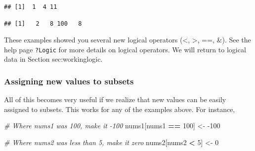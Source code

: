 \documentclass[]{book}
\newenvironment{Shaded}{\begin{snugshade}}{\end{snugshade}}
\newcommand{\CommentTok}[1]{\textcolor[rgb]{0.56,0.35,0.01}{\textit{#1}}}
\newcommand{\DecValTok}[1]{\textcolor[rgb]{0.00,0.00,0.81}{#1}}
\newcommand{\KeywordTok}[1]{\textcolor[rgb]{0.13,0.29,0.53}{\textbf{#1}}}
\newcommand{\NormalTok}[1]{#1}
\newcommand{\OperatorTok}[1]{\textcolor[rgb]{0.81,0.36,0.00}{\textbf{#1}}}
\newcommand{\StringTok}[1]{\textcolor[rgb]{0.31,0.60,0.02}{#1}}
\begin{document}
\begin{Shaded}
\end{Shaded}

\begin{verbatim}
## [1]  1  4 11
\end{verbatim}

\begin{Shaded}
\end{Shaded}

\begin{verbatim}
## [1]   2   8 100   8
\end{verbatim}

These examples showed you several new logical operators (\textless{}, \textgreater{}, ==, \&). See the help page \texttt{?Logic} for more details on logical operators. We will return to logical data in Section sec:workinglogic.

\hypertarget{assigning-new-values-to-subsets}{%
\subsubsection{Assigning new values to subsets}\label{assigning-new-values-to-subsets}}

All of this becomes very useful if we realize that new values can be easily assigned to subsets. This works for any of the examples above. For instance,

\begin{Shaded}
\begin{Highlighting}[]
\CommentTok{# Where nums1 was 100, make it -100}
\NormalTok{nums1[nums1 }\OperatorTok{==}\StringTok{ }\DecValTok{100}\NormalTok{] <-}\StringTok{ }\DecValTok{-100}

\CommentTok{# Where nums2 was less than 5, make it zero}
\NormalTok{nums2[nums2 }\OperatorTok{<}\StringTok{ }\DecValTok{5}\NormalTok{] <-}\StringTok{ }\DecValTok{0}
\end{Highlighting}
\end{Shaded}
\end{document}
